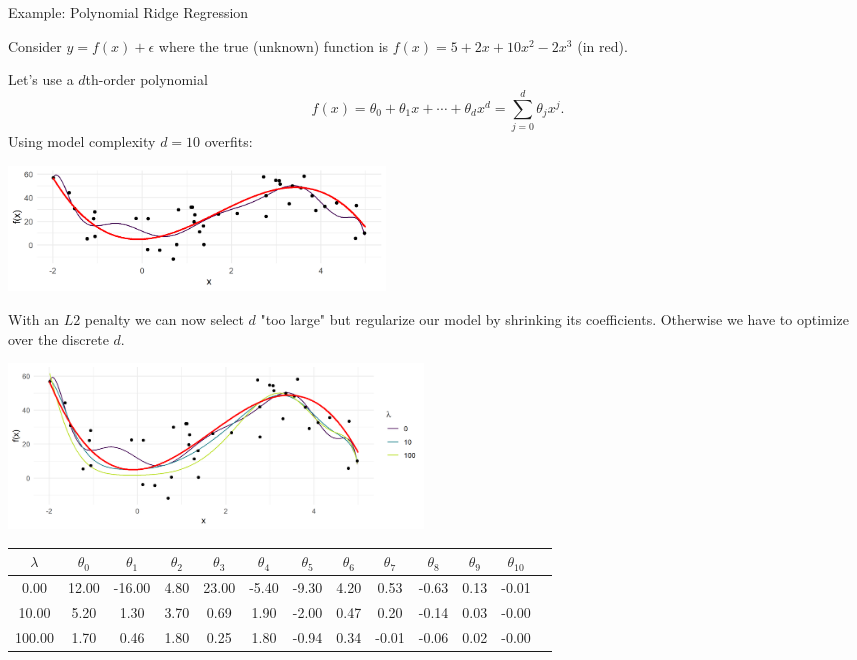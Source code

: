\documentclass[11pt,compress,t,notes=noshow, xcolor=table]{beamer}
\begin{document}
\begin{vbframe}{Example: Polynomial Ridge Regression}

Consider $y=f(x)+\epsilon$ where the true (unknown) function is \(f(x) = 5 + 2x +10x^2 - 2x^3\) (in red).

\lz

Let's use a \(d\)th-order polynomial
\[ f(x) = \theta_0 + \theta_1 x + \cdots + \theta_d x^d = \sum_{j = 0}^{d} \theta_j x^j\text{.} \]
Using model complexity $d = 10$ overfits:

\begin{center}
\includegraphics[width = 10cm ]{figure/poly_ridge_1.png} \\
\end{center}

\framebreak

With an $L2$ penalty we can now select $d$ "too large" but regularize our model by shrinking its coefficients. Otherwise we have to optimize over the discrete $d$.

\vfill

\begin{center}
\includegraphics[width = 11cm ]{figure/poly_ridge_2.png} \\
\end{center}


\begin{center}
\tiny
\begin{tabular}{ c| c c c c c c c c c c c c}
 $\lambda$ & $\theta_0$ & $\theta_1$ & $\theta_2$ & $\theta_3$ & $\theta_4$ & $\theta_5$ & $\theta_6$ & $\theta_7$ & $\theta_8$ & $\theta_9$ & $\theta_{10}$ \\ 
 \hline
 0.00 & 12.00 & -16.00 & 4.80 & 23.00 & -5.40 & -9.30 & 4.20 & 0.53 & -0.63 & 0.13 & -0.01 \\  
 10.00 & 5.20 &1.30 & 3.70 & 0.69 & 1.90 & -2.00 & 0.47 & 0.20 & -0.14 & 0.03 & -0.00 \\ 
 100.00 & 1.70 & 0.46 & 1.80 & 0.25 & 1.80 & -0.94 & 0.34 & -0.01 & -0.06 & 0.02 & -0.00
\end{tabular}
\end{center}


\end{vbframe}
\end{document}
